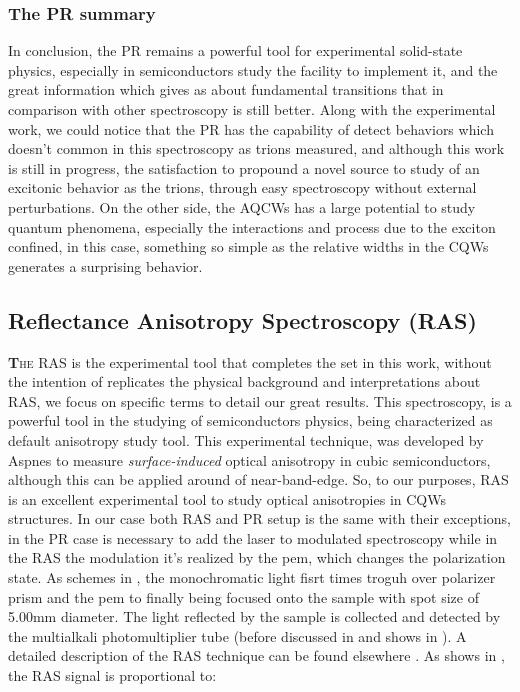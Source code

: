  \subsubsection{The PR summary}
 \label{subsubsec:chapter-3-ps-conclusions}
 \vspace{-10mm}
 In conclusion, the PR remains a powerful tool for experimental solid-state physics, especially in semiconductors study the facility to implement it, and the great information which gives as about fundamental transitions that in comparison with other spectroscopy is still better. Along with the experimental work, we could notice that the PR has the capability of detect behaviors which doesn't common in this spectroscopy as trions measured, and although this work is still in progress, the satisfaction to propound a novel source to study of an excitonic behavior as the trions,  through easy spectroscopy without external perturbations.  On the other side, the AQCWs has a large potential to study quantum phenomena, especially the interactions and process due to the exciton confined, in this case, something so simple as the relative widths in the CQWs generates a surprising behavior. 



\subsection{Reflectance Anisotropy Spectroscopy (RAS)}
\label{subsec:chapter-3-ras}
 \vspace{-10mm}
\lettrine[lines=3, lraise=.1, nindent=0mm, slope=0mm]{\textbf{T}}{he \gls{RAS}} is the experimental tool that completes the set in this work, without the intention of replicates the physical background and interpretations about RAS, we focus on specific terms to detail our great results.  This spectroscopy, is a  powerful tool in the studying of semiconductors physics, being characterized as default anisotropy study tool.  This experimental technique, was developed by Aspnes\cite{aspnes1973surface,aspnes1985anisotropies, aspnes1985above} to measure \emph{surface-induced} optical anisotropy in cubic semiconductors, although this can be applied around of near-band-edge\cite{wei1995theory}. So, to our purposes, \gls{RAS} is an excellent experimental tool to study optical anisotropies in CQWs structures. In our case both \gls{RAS} and \gls{PR} setup is the same with their exceptions, in the \gls{PR} case is necessary to add the laser to modulated spectroscopy while in the \gls{RAS} the modulation it's realized by the \gls{pem}, which changes the polarization state. As schemes in , the monochromatic light fisrt times troguh over polarizer prism and the \gls{pem} to finally being focused onto the sample with spot size of 5.00mm diameter. The light reflected by the sample is collected and detected by the multialkali photomultiplier tube (before discussed in  and shows in ). A detailed description of the RAS technique can be found elsewhere \cite{lflm1993spectrometer}. As shows in , the RAS signal is proportional to: 

